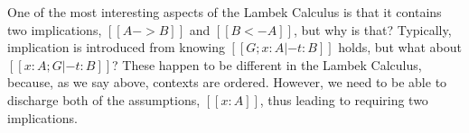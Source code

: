 One of the most interesting aspects of the Lambek Calculus is that it
contains two implications, $[[A -> B]]$ and $[[B <- A]]$, but why is
that?  Typically, implication is introduced from knowing $[[G;x : A |-
    t : B]]$ holds, but what about $[[x : A;G |- t : B]]$?  These
happen to be different in the Lambek Calculus, because, as we say
above, contexts are ordered.  However, we need to be able to discharge
both of the assumptions, $[[x : A]]$, thus leading to requiring two
implications.  

